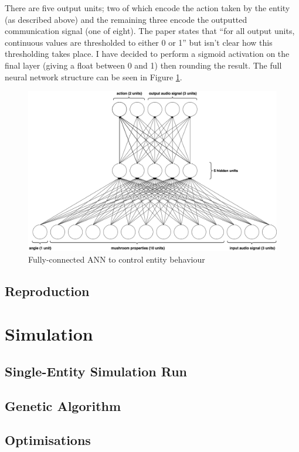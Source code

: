 \documentclass[12pt,a4paper,twoside,openright]{report}
\begin{document}
There are five output units; two of which encode the action taken by the entity (as described above) and the remaining three encode the outputted communication signal (one of eight). The paper states that ``for all output units, continuous values are thresholded to either 0 or 1'' but isn't clear how this thresholding takes place. I have decided to perform a sigmoid activation on the final layer (giving a float between 0 and 1) then rounding the result. The full neural network structure can be seen in Figure \ref{fig:fullneural}.

\begin{figure}[t]
  \centering
  \includegraphics[width=.9\linewidth]{figs/fullneural}
  \caption{Fully-connected ANN to control entity behaviour}
  \label{fig:fullneural}
\end{figure}

\subsection{Reproduction}

\section{Simulation}\label{section:simulation}

\subsection{Single-Entity Simulation Run}

\subsection{Genetic Algorithm}

\subsection{Optimisations}\label{section:optimisations}
\end{document}
